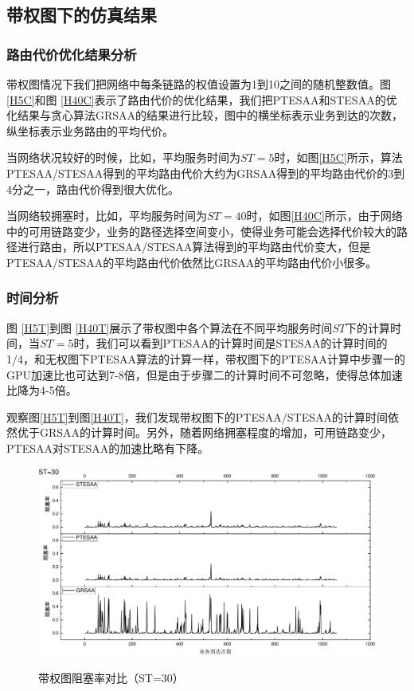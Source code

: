 \subsection{带权图下的仿真结果}
\subsubsection{路由代价优化结果分析}
带权图情况下我们把网络中每条链路的权值设置为1到10之间的随机整数值。图 \ref{H5C}和图 \ref{H40C}表示了路由代价的优化结果，我们把PTESAA和STESAA的优化结果与贪心算法GRSAA的结果进行比较，图中的横坐标表示业务到达的次数，纵坐标表示业务路由的平均代价。

当网络状况较好的时候，比如，平均服务时间为$ST=5$时，如图\ref{H5C}所示，算法PTESAA/STESAA得到的平均路由代价大约为GRSAA得到的平均路由代价的3到4分之一，路由代价得到很大优化。

当网络较拥塞时，比如，平均服务时间为$ST=40$时，如图\ref{H40C}所示，由于网络中的可用链路变少，业务的路径选择空间变小，使得业务可能会选择代价较大的路径进行路由，所以PTESAA/STESAA算法得到的平均路由代价变大，但是PTESAA/STESAA的平均路由代价依然比GRSAA的平均路由代价小很多。

\subsubsection{时间分析}
图 \ref{H5T}到图 \ref{H40T}展示了带权图中各个算法在不同平均服务时间$ST$下的计算时间，当$ST=5$时，我们可以看到PTESAA的计算时间是STESAA的计算时间的1/4，和无权图下PTESAA算法的计算一样，带权图下的PTESAA计算中步骤一的GPU加速比也可达到7-8倍，但是由于步骤二的计算时间不可忽略，使得总体加速比降为4-5倍。

观察图\ref{H5T}到图\ref{H40T}，我们发现带权图下的PTESAA/STESAA的计算时间依然优于GRSAA的计算时间。另外，随着网络拥塞程度的增加，可用链路变少，PTESAA对STESAA的加速比略有下降。
\begin{figure}
\setlength{\abovecaptionskip}{-0.5cm}
\begin{center}
{\includegraphics[width=0.8 \textwidth]{figures/H30Z.pdf}}
\end{center}
\caption{{\footnotesize{带权图阻塞率对比（ST=30）}}}
\label{H30Z}
\end{figure}



